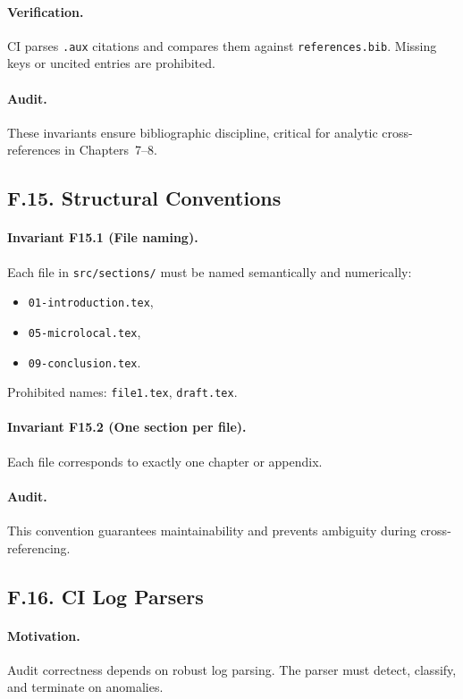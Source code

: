 \paragraph{Verification.}
CI parses \texttt{.aux} citations and compares them against
\texttt{references.bib}. Missing keys or uncited entries are prohibited.

\paragraph{Audit.}
These invariants ensure bibliographic discipline, critical for analytic
cross-references in Chapters~7–8.

\subsection*{F.15. Structural Conventions}

\paragraph{Invariant F15.1 (File naming).}
Each file in \texttt{src/sections/} must be named semantically and
numerically:
\begin{itemize}
  \item \texttt{01-introduction.tex},
  \item \texttt{05-microlocal.tex},
  \item \texttt{09-conclusion.tex}.
\end{itemize}
Prohibited names: \texttt{file1.tex}, \texttt{draft.tex}.

\paragraph{Invariant F15.2 (One section per file).}
Each file corresponds to exactly one chapter or appendix.

\paragraph{Audit.}
This convention guarantees maintainability and prevents ambiguity during
cross-referencing.

\subsection*{F.16. CI Log Parsers}

\paragraph{Motivation.}
Audit correctness depends on robust log parsing. The parser must detect,
classify, and terminate on anomalies.

